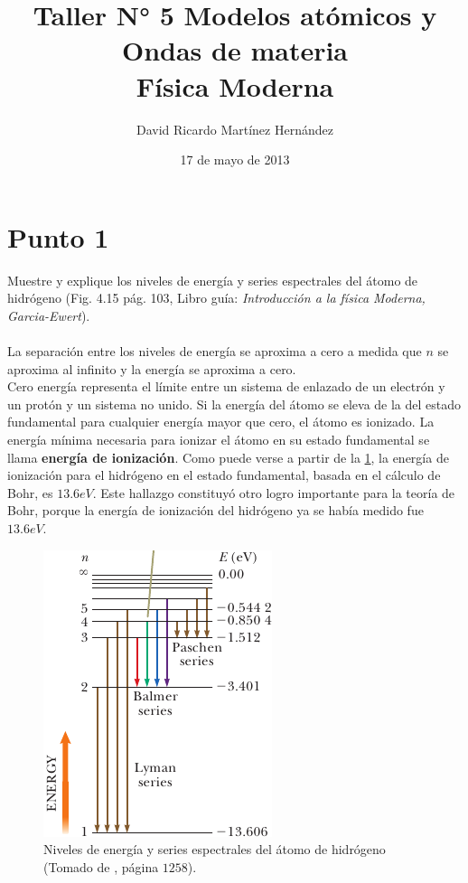 \documentclass[11pt,graphicx,caption,rotating]{article}
\title{Taller N° 5 Modelos atómicos y Ondas de materia\\ Física Moderna}
\author{David Ricardo Martínez Hernández}
\date{17 de mayo de 2013}
\begin{document}
\maketitle

\section{Punto 1}
\noindent
Muestre y explique los niveles de energía y series espectrales del átomo de hidrógeno (Fig. 4.15 pág. 103, Libro guía: \textit{Introducción a la física Moderna, Garcia-Ewert}).\\\\
La separación entre los niveles de energía se aproxima a cero a medida que $n$ se aproxima al infinito y la energía se aproxima a cero.\\
Cero energía representa el límite entre un sistema de enlazado de un electrón y un protón y un sistema no unido. Si la energía del átomo se eleva de la del estado fundamental para cualquier energía mayor que cero, el átomo es ionizado. La energía mínima necesaria para ionizar el átomo en su estado fundamental se llama \textbf{energía de ionización}. Como puede verse a partir de la \ref{fig1}, la energía de ionización para el hidrógeno en el estado fundamental, basada en el cálculo de Bohr, es $13.6 eV$. Este hallazgo constituyó otro logro importante para la teoría de Bohr, porque la energía de ionización del hidrógeno ya se había medido fue $13.6 eV$.
\begin{figure}[H]
	\centering
		\includegraphics[scale=0.75]{line.png}
	\caption{Niveles de energía y series espectrales del átomo de hidrógeno (Tomado de \cite{serway}, página $1258$).}
	\label{fig1}
\end{figure}
\end{document}
